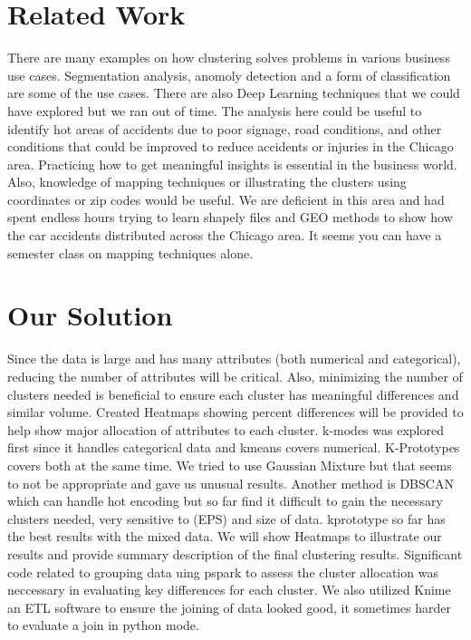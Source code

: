 \documentclass[conference]{IEEEtran}
\begin{document}
\section{Related Work}
There are many examples on how clustering solves problems in various business use cases.  Segmentation analysis, anomoly detection and a form of classification are some of the use cases. There are also Deep Learning techniques that we could have explored but we ran out of time.  The analysis here could be useful to identify hot areas of accidents due to poor signage, road conditions, and other conditions that could be improved to reduce accidents or injuries in the Chicago area.  Practicing how to get meaningful insights is essential in the business world.  Also, knowledge of mapping techniques or illustrating the clusters using coordinates or zip codes would be useful.  We are deficient in this area and had spent endless hours trying to learn shapely files and GEO methods to show how the car accidents distributed across the Chicago area.  It seems you can have a semester class on mapping techniques alone.


\section{Our Solution}
Since the data is large and has many attributes (both numerical and categorical), reducing the number of attributes will be critical.  Also, minimizing the number of clusters needed is beneficial to ensure each cluster has meaningful differences and similar volume. Created Heatmaps showing percent differences will be provided to help show major allocation of attributes to each cluster. k-modes was explored first since it handles categorical data and kmeans covers numerical.  K-Prototypes covers both at the same time.  We tried to use Gaussian Mixture but that seems to not be appropriate and gave us unusual results.  Another method is DBSCAN which can handle hot encoding but so far find it difficult to gain the necessary clusters needed, very sensitive to (EPS) and size of data.  kprototype so far has the best results with the mixed data.  We will show Heatmaps to illustrate our results and provide summary description of the final clustering results.  Significant code related to grouping data uing pspark to assess the cluster allocation was neccessary in evaluating key differences for each cluster.  We also utilized Knime an ETL software to ensure the joining of data looked good,  it sometimes harder to evaluate a join in python mode.
\end{document}
